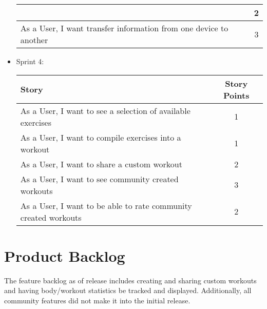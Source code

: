 \documentclass[12pt,letterpaper]{article}
\begin{document}
\begin{itemize}
\begin{tabular}{|l|c|}
					 & 2 \\ 
					\hline 
					As a User, I want transfer information from one device to another & 3 \\ 
					\hline 
					\end{tabular} 
				\item Sprint 4:\\
					\begin{tabular}{|l|c|}
					\hline 
					Story & Story Points \\ 
					\hline 
					As a User, I want to see a selection of available exercises & 1 \\ 
					\hline 
					As a User, I want to compile exercises into a workout & 1 \\ 
					\hline 
					As a User, I want to share a custom workout & 2 \\ 
					\hline 
					As a User, I want to see community created workouts & 3 \\ 
					\hline 
					As a User, I want to be able to rate community created workouts & 2 \\ 
					\hline 
					\end{tabular} 
			\end{itemize}
		\section{Product Backlog}
		    The feature backlog as of release includes creating and sharing custom workouts and having body/workout statistics be tracked and displayed. Additionally, all community features did not make it into the initial release.
\end{document}
